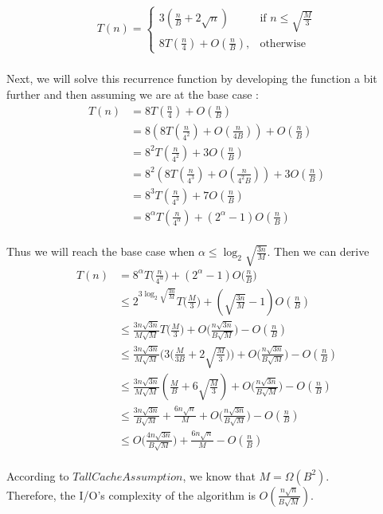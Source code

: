 \begin{align*}
	T(n) = \begin{cases}
	    3( \frac{n}{B} + 2\sqrt{n} ) \,& \text{if } n \leq \sqrt{ \frac{M}{3} }\\
	    8T(\frac{n}{4}) + O(\frac{n}{B}),              & \text{otherwise}
	\end{cases}
\end{align*}
\\
Next, we will solve this recurrence function by developing the function a bit further and then assuming we are at the base case :
\begin{align*}
T(n) &= 8T(\frac{n}{4}) + O(\frac{n}{B}) \\
&= 8( 8T(\frac{n}{4^2}) + O(\frac{n}{4B}) ) + O(\frac{n}{B}) \\
&= 8^2T(\frac{n}{4^2}) + 3O(\frac{n}{B}) \\
&= 8^2( 8T(\frac{n}{4^3}) + O(\frac{n}{4^2B}) ) + 3O(\frac{n}{B}) \\
&= 8^3T(\frac{n}{4^3}) + 7O(\frac{n}{B}) \\
&= 8^{\alpha}T(\frac{n}{4^\alpha}) + ( 2^\alpha - 1 )O(\frac{n}{B})
\end{align*}
\\
Thus we will reach the base case when $\alpha \leq \log_2{ \sqrt{ \frac{3n}{M} }}$. Then we can derive
\begin{align*}
T(n) &= 8^{\alpha}T\Big(\frac{n}{4^\alpha}\Big) + ( 2^{\alpha} - 1 )O\Big(\frac{n}{B}\Big) \\
&\leq 2^{3\log_2{ \sqrt{ \frac{3n}{M} }}} T\Big( \frac{M}{3} \Big) + ( \sqrt{ \frac{3n}{M} } - 1 )O(\frac{n}{B}) \\
&\leq \frac{3n\sqrt{3n}}{M\sqrt{M}} T\Big( \frac{M}{3} \Big) + O\Big(\frac{n\sqrt{3n}}{B\sqrt{M}}\Big) - O(\frac{n}{B})\\
&\leq \frac{3n\sqrt{3n}}{M\sqrt{M}} \Big( 3 \Big(\frac{M}{3B} + 2\sqrt{\frac{M}{3}}\Big)\Big) + O\Big(\frac{n\sqrt{3n}}{B\sqrt{M}}\Big)- O(\frac{n}{B}) \\
&\leq \frac{3n\sqrt{3n}}{M\sqrt{M}} ( \frac{M}{B} + 6\sqrt{\frac{M}{3}}) + O\Big(\frac{n\sqrt{3n}}{B\sqrt{M}}\Big)- O(\frac{n}{B}) \\
&\leq \frac{3n\sqrt{3n}}{B\sqrt{M}} + \frac{6n\sqrt{n}}{M} + O\Big(\frac{n\sqrt{3n}}{B\sqrt{M}}\Big)- O(\frac{n}{B}) \\
&\leq O\Big(\frac{4n\sqrt{3n}}{B\sqrt{M}}\Big) + \frac{6n\sqrt{n}}{M} - O(\frac{n}{B})
\end{align*}
\\
According to $Tall Cache Assumption$, we know that $M = \Omega(B^2)$.
\\
Therefore, the I/O's complexity of the algorithm is $O(\frac{n\sqrt{n}}{B\sqrt{M}})$.



